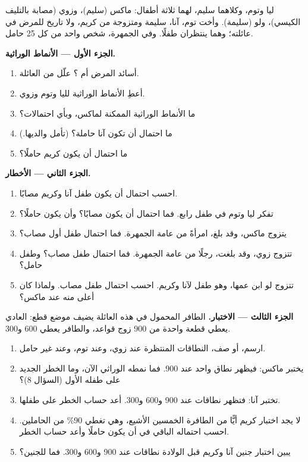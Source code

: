 \begin{problem}
\label{pb:g11:genes-and-disease:1}
ليا وتوم، وكلاهما سليم، لهما ثلاثة أطفال: ماكس (سليم)، وزوي (مصابة
بالتليف الكيسي)، ولو (سليمة). وأخت توم، آنا، سليمة ومتزوجة من كريم،
ولا تاريخ للمرض في عائلته؛ وهما ينتظران طفلًا. وفي الجمهرة، شخص واحد
من كل 25 حامل.

\medskip
\noindent\textbf{الجزء الأول --- الأنماط الوراثية.}
\begin{enumerate}
  \item أسائد المرض أم ؟ علّل من العائلة.
  \item أعطِ الأنماط الوراثية لليا وتوم وزوي.
  \item ما الأنماط الوراثية الممكنة لماكس، وبأي احتمالات؟
  \item ما احتمال أن تكون آنا حاملة؟ (تأمل والديها.)
  \item ما احتمال أن يكون كريم حاملًا؟
\end{enumerate}

\medskip
\noindent\textbf{الجزء الثاني --- الأخطار.}
\begin{enumerate}[resume]
  \item احسب احتمال أن يكون طفل آنا وكريم مصابًا.
  \item تفكر ليا وتوم في طفل رابع. فما احتمال أن يكون مصابًا؟ وأن
        يكون حاملًا؟
  \item يتزوج ماكس، وقد بلغ، امرأةً من عامة الجمهرة. فما احتمال طفل
        أول مصاب؟
  \item تتزوج زوي، وقد بلغت، رجلًا من عامة الجمهرة. فما احتمال طفل
        مصاب؟ وطفل حامل؟
  \item تتزوج لو ابن عمها، وهو طفل لآنا وكريم. احسب احتمال طفل مصاب.
        ولماذا كان أعلى منه عند ماكس؟
\end{enumerate}

\medskip
\noindent\textbf{الجزء الثالث --- الاختبار.}
 الطافر المحمول في هذه العائلة يضيف موضع قطع:  العادي
يعطي قطعة واحدة من 900 زوج قواعد، والطافر يعطي 600 و300.
\begin{enumerate}[resume]
  \item ارسم، أو صف، النطاقات المنتظرة عند زوي، وعند توم، وعند غير
        حامل.
  \item يختبر ماكس: فيظهر نطاق واحد عند 900. فما نمطه الوراثي الآن،
        وما الخطر الجديد على طفله الأول (السؤال 8)؟
  \item تختبر آنا: فتظهر نطاقات عند 900 و600 و300. أعد حساب الخطر على
        طفلها.
  \item لا يجد اختبار كريم أيًّا من  الطافرة الخمسين الأشيع،
        وهي تغطي 90\% من الحاملين. احسب احتماله الباقي في أن يكون
        حاملًا وأعد حساب الخطر.
  \item يبين اختبار جنين آنا وكريم قبل الولادة نطاقات عند 900 و600
        و300. فما   للجنين؟
\end{enumerate}


\end{problem}
